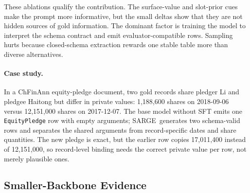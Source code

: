 \documentclass[runningheads]{llncs}
\newcommand{\method}{SARGE}
\begin{document}
These ablations qualify the contribution. The surface-value and slot-prior cues make the prompt more informative, but the small deltas show that they are not hidden sources of gold information. The dominant factor is training the model to interpret the schema contract and emit evaluator-compatible rows. Sampling hurts because closed-schema extraction rewards one stable table more than diverse alternatives.

\paragraph{Case study.} In a ChFinAnn equity-pledge document, two gold records share pledger Li and pledgee Haitong but differ in private values: 1,188,600 shares on 2018-09-06 versus 12,151,000 shares on 2017-12-07. The base model without SFT emits one \texttt{EquityPledge} row with empty arguments; \method\ generates two schema-valid rows and separates the shared arguments from record-specific dates and share quantities. The new pledge is exact, but the earlier row copies 17,011,400 instead of 12,151,000, so record-level binding needs the correct private value per row, not merely plausible ones.

\subsection{Smaller-Backbone Evidence}

\begin{table}[t]
\centering
\caption{Smaller-backbone evidence on test splits. All rows use seed 13; these are not strict same-checkpoint scale controls.}
\label{tab:smaller-backbone}
\scriptsize
\setlength{\tabcolsep}{2.6pt}
\end{table}
\end{document}
